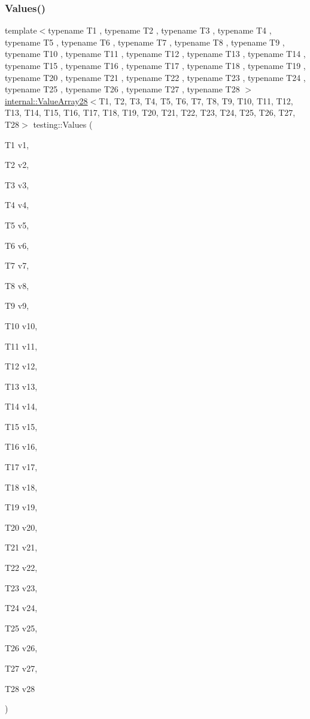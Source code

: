 \mbox{\label{namespacetesting_a5785254e0510108d9d422e32ba18f170}} 
\subsubsection{\texorpdfstring{Values()}{Values()}\hspace{0.1cm}{\footnotesize\ttfamily [29/51]}}
{\footnotesize\ttfamily template$<$typename T1 , typename T2 , typename T3 , typename T4 , typename T5 , typename T6 , typename T7 , typename T8 , typename T9 , typename T10 , typename T11 , typename T12 , typename T13 , typename T14 , typename T15 , typename T16 , typename T17 , typename T18 , typename T19 , typename T20 , typename T21 , typename T22 , typename T23 , typename T24 , typename T25 , typename T26 , typename T27 , typename T28 $>$ \\
\mbox{\hyperlink{classtesting_1_1internal_1_1_value_array28}{internal\+::\+Value\+Array28}}$<$T1, T2, T3, T4, T5, T6, T7, T8, T9, T10, T11, T12, T13, T14, T15, T16, T17, T18, T19, T20, T21, T22, T23, T24, T25, T26, T27, T28$>$ testing\+::\+Values (\begin{DoxyParamCaption}\item[{T1}]{v1,  }\item[{T2}]{v2,  }\item[{T3}]{v3,  }\item[{T4}]{v4,  }\item[{T5}]{v5,  }\item[{T6}]{v6,  }\item[{T7}]{v7,  }\item[{T8}]{v8,  }\item[{T9}]{v9,  }\item[{T10}]{v10,  }\item[{T11}]{v11,  }\item[{T12}]{v12,  }\item[{T13}]{v13,  }\item[{T14}]{v14,  }\item[{T15}]{v15,  }\item[{T16}]{v16,  }\item[{T17}]{v17,  }\item[{T18}]{v18,  }\item[{T19}]{v19,  }\item[{T20}]{v20,  }\item[{T21}]{v21,  }\item[{T22}]{v22,  }\item[{T23}]{v23,  }\item[{T24}]{v24,  }\item[{T25}]{v25,  }\item[{T26}]{v26,  }\item[{T27}]{v27,  }\item[{T28}]{v28 }\end{DoxyParamCaption})}

